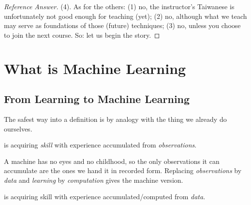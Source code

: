 \begin{proof}[Reference Answer]
    (4). As for the others: (1) no, the instructor's Taiwanese is unfortunately
    not good enough for teaching (yet); (2) no, although what we teach may serve
    as foundations of those (future) techniques; (3) no, unless you choose to
    join the next course. So: let us begin the story.
\end{proof}

\section{What is Machine Learning}\label{sec:what-is-ml}


\subsection{From Learning to Machine Learning}

The safest way into a definition is by analogy with the thing we already do
ourselves.

\begin{definition}[Learning]
     is acquiring \emph{skill} with experience accumulated from
    \emph{observations}.
\end{definition}

\begin{center}
\end{center}

A machine has no eyes and no childhood, so the only observations it can
accumulate are the ones we hand it in recorded form. Replacing
\emph{observations} by \emph{data} and \emph{learning} by \emph{computation}
gives the machine version.

\begin{definition}
     is acquiring skill with experience
    accumulated/computed from \emph{data}.
\end{definition}

\begin{center}
\end{center}


